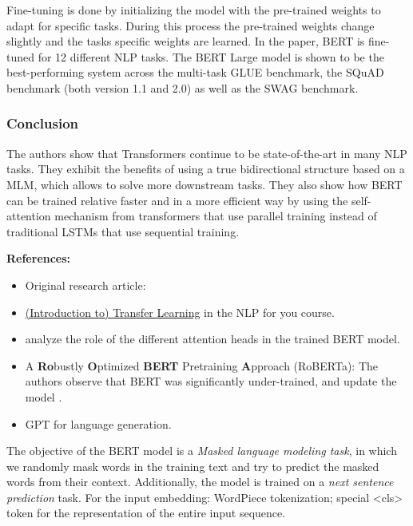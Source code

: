 \documentclass[11pt, a4paper]{amsart}
\begin{document}
Fine-tuning is done by initializing the model with the pre-trained weights to adapt for specific tasks. 
During this process the pre-trained weights change slightly and the tasks specific weights are learned.
In the paper, BERT is fine-tuned for 12 different NLP tasks.
The BERT Large model is shown to be the best-performing system across the multi-task GLUE benchmark, the SQuAD benchmark (both version 1.1 and 2.0) as well as the SWAG benchmark.

\subsubsection{Conclusion}

The authors show that Transformers continue to be state-of-the-art in many NLP tasks. 
They exhibit the benefits of using a true bidirectional structure based on a MLM, which allows to solve more downstream tasks. 
They also show how BERT can be trained relative faster and in a more efficient way by using the self-attention mechanism from transformers that use parallel training instead of traditional LSTMs that use sequential training.

\noindent \textbf{References:}
\begin{itemize}
	\item Original research article:  \cite{DBLP:journals/corr/abs-1810-04805}
	\item \href{https://lena-voita.github.io/nlp_course/transfer_learning.html}{(Introduction to) Transfer Learning} in the NLP for you course.
	\item \cite{clark-etal-2019-bert} analyze the role of the different attention heads in the trained BERT model.
	\item A \textbf{Ro}bustly \textbf{O}ptimized \textbf{BERT} Pretraining \textbf{A}pproach (RoBERTa):
	The authors observe that BERT was significantly under-trained, and update the model \cite{DBLP:journals/corr/abs-1907-11692}.
	\item GPT for language generation.
\end{itemize}

{
	\color{blue}
	
	The objective of the BERT model is a \emph{Masked language modeling task}, in which we randomly mask words in the training text and try to predict the masked words from their context.
	Additionally, the model is trained on a \emph{next sentence prediction} task.
	For the input embedding: WordPiece tokenization;
	special <cls> token for the representation of the entire input sequence.
} %
\end{document}
